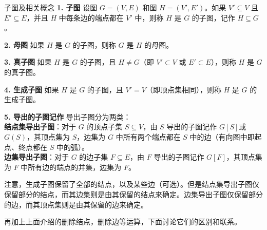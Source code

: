 \begin{definition}{子图及相关概念}{}
\textbf{1. 子图}
设图 $G = (V, E)$ 和图 $H = (V', E')$。如果 $V' \subseteq V$ 且 $E' \subseteq E$，并且 $H$ 中每条边的端点都在 $V'$ 中，则称 $H$ 是 $G$ 的子图，记作 $H \subseteq G$。

\textbf{2. 母图}
如果 $H$ 是 $G$ 的子图，则称 $G$ 是 $H$ 的母图。

\textbf{3. 真子图}
如果 $H$ 是 $G$ 的子图，且 $H \neq G$（即 $V' \subset V$ 或 $E' \subset E$），则称 $H$ 是 $G$ 的真子图。

\textbf{4. 生成子图}
如果 $H$ 是 $G$ 的子图，且 $V' = V$（即顶点集相同），则称 $H$ 是 $G$ 的生成子图。

\textbf{5. 导出的子图记作}
导出子图分为两类：\\
\textbf{结点集导出子图}：对于 $G$ 的顶点子集 $S \subseteq V$，由 $S$ 导出的子图记作 $G[S]$或$G(S)$，其顶点集为 $S$，边集为 $G$ 中所有两个端点都在 $S$ 中的边（有向图中即起点、终点都在 $S$ 中的弧）。\\
\textbf{边集导出子图}：对于 $G$ 的边子集 $F \subseteq E$，由 $F$ 导出的子图记作 $G[F]$，其顶点集为 $F$ 中所有边的端点的并集，边集为 $F$。
\end{definition}
注意，生成子图保留了全部的结点，以及某些边（可选）。但是结点集导出子图仅保留部分的结点，而其边集则是由其保留的结点来确定。边集导出子图仅保留部分的边，而其顶点集则是由其保留的边来确定。

再加上上面介绍的删除结点，删除边等运算，下面讨论它们的区别和联系。

